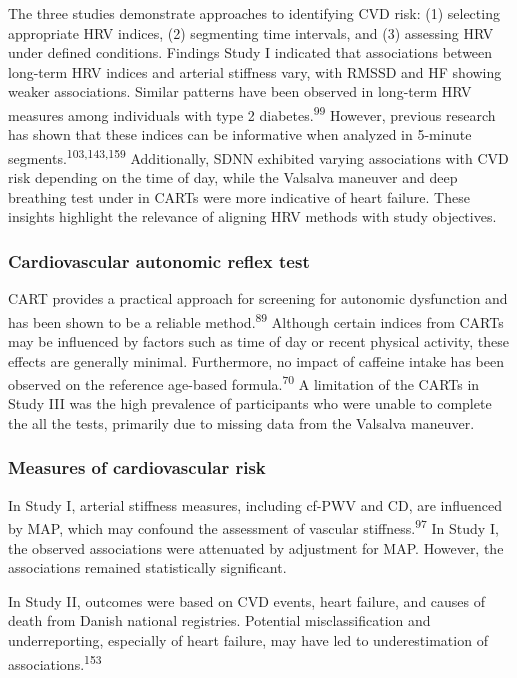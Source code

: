\documentclass[
  a4paper,
  headsepline=true,
  open=left]{scrbook}
\begin{document}
The three studies demonstrate approaches to identifying CVD risk: (1)
selecting appropriate HRV indices, (2) segmenting time intervals, and
(3) assessing HRV under defined conditions. Findings Study I indicated
that associations between long-term HRV indices and arterial stiffness
vary, with RMSSD and HF showing weaker associations. Similar patterns
have been observed in long-term HRV measures among individuals with type
2 diabetes.\textsuperscript{99} However, previous research has shown
that these indices can be informative when analyzed in 5-minute
segments.\textsuperscript{103,143,159} Additionally, SDNN exhibited
varying associations with CVD risk depending on the time of day, while
the Valsalva maneuver and deep breathing test under in CARTs were more
indicative of heart failure. These insights highlight the relevance of
aligning HRV methods with study objectives.

\hypertarget{cardiovascular-autonomic-reflex-test}{%
\subsubsection{Cardiovascular autonomic reflex
test}\label{cardiovascular-autonomic-reflex-test}}

CART provides a practical approach for screening for autonomic
dysfunction and has been shown to be a reliable
method.\textsuperscript{89} Although certain indices from CARTs may be
influenced by factors such as time of day or recent physical activity,
these effects are generally minimal. Furthermore, no impact of caffeine
intake has been observed on the reference age-based
formula.\textsuperscript{70} A limitation of the CARTs in Study III was
the high prevalence of participants who were unable to complete the all
the tests, primarily due to missing data from the Valsalva maneuver.

\hypertarget{measures-of-cardiovascular-risk}{%
\subsubsection{Measures of cardiovascular
risk}\label{measures-of-cardiovascular-risk}}

In Study I, arterial stiffness measures, including cf-PWV and CD, are
influenced by MAP, which may confound the assessment of vascular
stiffness.\textsuperscript{97} In Study I, the observed associations
were attenuated by adjustment for MAP. However, the associations
remained statistically significant.

In Study II, outcomes were based on CVD events, heart failure, and
causes of death from Danish national registries. Potential
misclassification and underreporting, especially of heart failure, may
have led to underestimation of associations.\textsuperscript{153}
\end{document}
